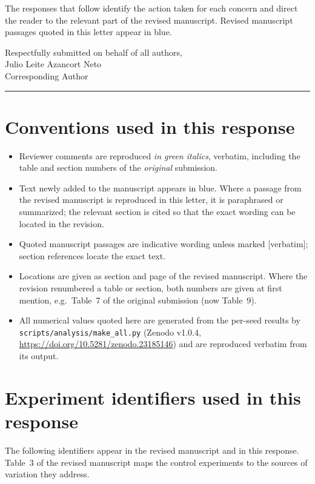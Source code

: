 \documentclass[11pt,a4paper]{article}
\newcommand{\newtext}[1]{#1}
\newcommand{\newtext}[1]{\textcolor{chgcolor}{``#1''}}
\newcommand{\renum}[2]{#1 of the original submission (now #2)}
\begin{document}
The responses that follow identify the action taken for each concern and
direct the reader to the relevant part of the revised manuscript. Revised
manuscript passages quoted in this letter appear in
\textcolor{chgcolor}{blue}.

\bigskip
\noindent
Respectfully submitted on behalf of all authors,\\[6pt]
Julio Leite Azancort Neto\\
Corresponding Author

\medskip\noindent\rule{\linewidth}{0.4pt}\medskip

\section*{Conventions used in this response}

\begin{itemize}[leftmargin=1.2em,itemsep=0.35em]
\item Reviewer comments are reproduced \textcolor{rccolor}{\itshape in
      green italics}, verbatim, including the table and section numbers
      of the \emph{original} submission.
\item Text newly added to the manuscript appears \newtext{in blue}.
      Where a passage from the revised manuscript is reproduced in this
      letter, it is paraphrased or summarized; the relevant section is
      cited so that the exact wording can be located in the revision.
\item Quoted manuscript passages are indicative wording unless marked
      {[verbatim]}; section references locate the exact text.
\item Locations are given as section and page of the revised manuscript.
      Where the revision renumbered a table or section, both numbers are
      given at first mention, e.g.\ \renum{Table~7}{Table~9}.
\item All numerical values quoted here are generated from the per-seed
      results by \texttt{scripts/analysis/make\_all.py} (Zenodo v1.0.4,
      \url{https://doi.org/10.5281/zenodo.23185146}) and are
      reproduced verbatim from its output.
\end{itemize}

\section*{Experiment identifiers used in this response}

\noindent
The following identifiers appear in the revised manuscript and in this
response. Table~3 of the revised manuscript maps the control experiments
to the sources of variation they address.
\end{document}
